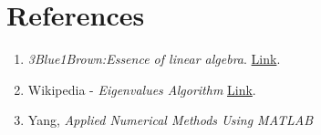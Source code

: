 \documentclass[final]{article}
\begin{document}
\section*{References}
\begin{enumerate}
    \item \textit{3Blue1Brown:Essence of linear algebra}. 
        \href{https://www.youtube.com/watch?v=fNk_zzaMoSs&list=PLZHQObOWTQDPD3MizzM2xVFitgF8hE_ab}{Link}.
    \item Wikipedia - \textit{Eigenvalues Algorithm}
        \href{https://en.wikipedia.org/wiki/Eigenvalue_algorithm}{Link}.
        \item Yang, \textit{Applied Numerical Methods Using MATLAB}
\end{enumerate}

            
        
    
\end{document}
